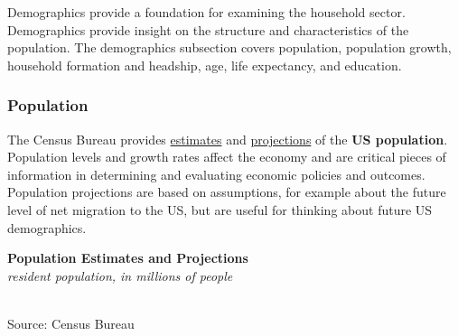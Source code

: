 \documentclass{report}
\makeatletter
\newcommand{\tbllink}[1]{\href{https://raw.githubusercontent.com/bdecon/US-chartbook/master/chartbook/data/#1}{\faTable}}
\newcommand*\short[1]{\expandafter\@gobbletwo\number\numexpr#1\relax}
\newcommand{\absnode}[3]{\node[below right, align=left] at (axis cs: #1,#2) {#3};}
\newcommand{\dateaxisticks}{
		date coordinates in=x, axis line style={draw=none},
		xmax={2022-10-31},
		max space between ticks=40,	    
		xtick={{1990-01-01}, {1992-01-01}, {1994-01-01}, 
			{1996-01-01}, {1998-01-01}, {2000-01-01}, 
			{2002-01-01}, {2004-01-01}, {2006-01-01},
			{2008-01-01}, {2010-01-01}, {2012-01-01}, {2014-01-01},
		    {2016-01-01}, {2018-01-01}, {2020-01-01}, {2022-01-01}, 
		    {2024-01-01}, {2026-01-01}},
		minor xtick={{1989-01-01}, {1991-01-01}, {1993-01-01},
			{1995-01-01}, {1997-01-01}, {1999-01-01}, 
			{2001-01-01}, {2003-01-01}, {2005-01-01}, {2007-01-01},
		    {2009-01-01}, {2011-01-01}, {2013-01-01}, {2015-01-01},
		    {2017-01-01}, {2019-01-01}, {2021-01-01}, {2023-01-01}, 
		    {2025-01-01}, {2027-01-01}},
		enlarge y limits={0.06}, enlarge x limits={0.01},
		}
\newcommand{\bbar}[2]{extra #1 ticks = {{#2}}, extra #1 tick labels = ,
		extra #1 tick style = {grid=major, grid style={thick, black!25}},}
\newcommand{\thickline}[4]{\addplot[ultra thick, no markers, color=#1] 
		table [x=#2, y=#3, col sep=comma] {#4};	}
\newcommand{\rbars}{
		\fill[color=black!10] (axis cs:{1990-07-01},\pgfkeysvalueof{/pgfplots/ymin}) rectangle 
			(axis cs:{1991-03-01}, \pgfkeysvalueof{/pgfplots/ymax});
		\fill[color=black!10] (axis cs:{2007-12-01},\pgfkeysvalueof{/pgfplots/ymin}) rectangle 
			(axis cs:{2009-07-01}, \pgfkeysvalueof{/pgfplots/ymax});
		\fill[color=black!10] (axis cs:{2001-03-01},\pgfkeysvalueof{/pgfplots/ymin}) rectangle 
			(axis cs:{2001-11-01}, \pgfkeysvalueof{/pgfplots/ymax});
		\fill[color=black!10] (axis cs:{2020-02-01},\pgfkeysvalueof{/pgfplots/ymin}) rectangle 
			(axis cs:{2020-05-01}, \pgfkeysvalueof{/pgfplots/ymax});}
\makeatother
\begin{document}
{\begin{minipage}{0.76\textwidth}
\small Demographics provide a foundation for examining the household sector. Demographics provide insight on the structure and characteristics of the population. The demographics subsection covers population, population growth, household formation and headship, age, life expectancy, and education.

\subsubsection*{Population}
\small The Census Bureau provides \href{https://www.census.gov/programs-surveys/popest.html}{estimates} and \href{https://www.census.gov/programs-surveys/popproj.html}{projections} of the \textbf{US population}. Population levels and growth rates affect the economy and are critical pieces of information in determining and evaluating economic policies and outcomes. Population projections are based on assumptions, for example about the future level of net migration to the US, but are useful for thinking about future US demographics.


\vspace{1mm}

\normalsize \textbf{Population Estimates and Projections}\\
\footnotesize{\textit{resident population, in millions of people}}\\
\hspace*{-2mm} \\
\footnotesize{Source: Census Bureau} \hfill \tbllink{pop_est.csv}
\vspace{2mm}


\end{minipage}}
\end{document}

